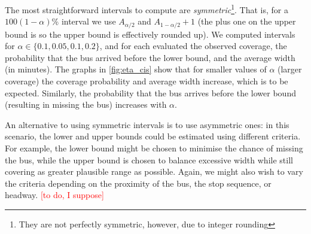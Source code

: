 The most straightforward intervals to compute are \emph{symmetric}\footnote{They are not perfectly symmetric, however, due to integer rounding}. That is, for a \mbox{$100(1-\alpha)$\%} interval we use $A_{\alpha/2}$ and $A_{1-\alpha/2} + 1$ (the plus one on the upper bound is so the upper bound is effectively rounded up). We computed intervals for $\alpha \in \{0.1, 0.05, 0.1, 0.2\}$, and for each evaluated the observed coverage, the probability that the bus arrived before the lower bound, and the average width (in minutes). The graphs in \cref{fig:eta_cis} show that for smaller values of $\alpha$ (larger coverage) the coverage probability and average width increase, which is to be expected. Similarly, the probability that the bus arrives before the lower bound (resulting in missing the bus) increases with $\alpha$.

An alternative to using symmetric intervals is to use asymmetric ones: in this scenario, the lower and upper bounds could be estimated using different criteria. For example, the lower bound might be chosen to minimise the chance of missing the bus, while the upper bound is chosen to balance excessive width while still covering as greater plausible range as possible. Again, we might also wish to vary the criteria depending on the proximity of the bus, the stop sequence, or headway. \textcolor{red}{[to do, I suppose]}
